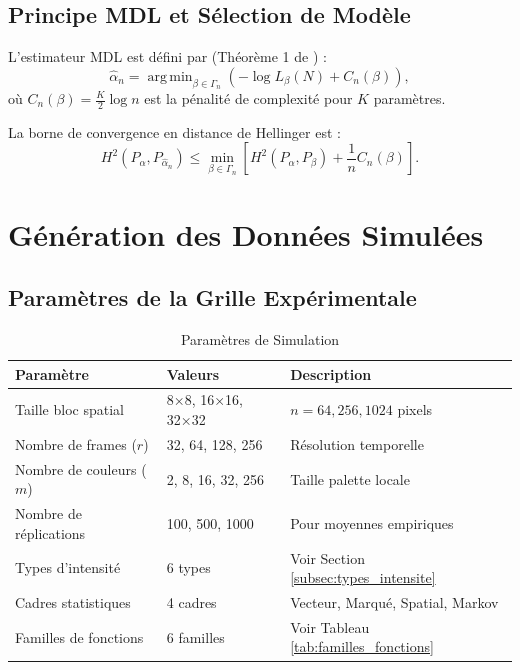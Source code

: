 \documentclass[12pt,a4paper]{article}
\newcommand{\argmin}{\mathop{\mathrm{arg\,min}}}
\begin{document}
	\subsection{Principe MDL et Sélection de Modèle}
	\label{subsec:principe_mdl}
	
	L'estimateur MDL est défini par (Théorème 1 de \cite{versatile_main.tex}) :
	\begin{equation}
		\hat{\alpha}_n = \argmin_{\beta \in \Gamma_n} \left( -\log L_{\beta}(N) + C_n(\beta) \right),
	\end{equation}
	où $C_n(\beta) = \frac{K}{2} \log n$ est la pénalité de complexité pour $K$ paramètres.
	
	La borne de convergence en distance de Hellinger est :
	\begin{equation}
		H^2(P_{\alpha}, P_{\hat{\alpha}_n}) \leq \min_{\beta \in \Gamma_n} \left[ H^2(P_{\alpha}, P_{\beta}) + \frac{1}{n} C_n(\beta) \right].
	\end{equation}
	
	\section{Génération des Données Simulées}
	\label{sec:generation_donnees}
	
	\subsection{Paramètres de la Grille Expérimentale}
	\label{subsec:parametres_grille}
	
	\begin{table}[h]
		\centering
		\caption{Paramètres de Simulation}
		\label{tab:parametres_simulation}
		\begin{tabular}{@{}lll@{}}
			\toprule
			\textbf{Paramètre} & \textbf{Valeurs} & \textbf{Description} \\
			\midrule
			Taille bloc spatial & 8×8, 16×16, 32×32 & $n = 64, 256, 1024$ pixels \\
			Nombre de frames ($r$) & 32, 64, 128, 256 & Résolution temporelle \\
			Nombre de couleurs ($m$) & 2, 8, 16, 32, 256 & Taille palette locale \\
			Nombre de réplications & 100, 500, 1000 & Pour moyennes empiriques \\
			Types d'intensité & 6 types & Voir Section \ref{subsec:types_intensite} \\
			Cadres statistiques & 4 cadres & Vecteur, Marqué, Spatial, Markov \\
			Familles de fonctions & 6 familles & Voir Tableau \ref{tab:familles_fonctions} \\
			\bottomrule
		\end{tabular}
	\end{table}
	
\end{document}
